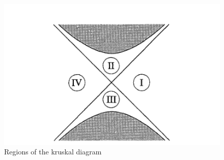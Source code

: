 \begin{figure}[h]
\centering
\includegraphics[width=\linewidth]{imm/kregion.png}
\caption{Regions of the kruskal diagram}
\label{imm:kregion.png}
\end{figure}





























